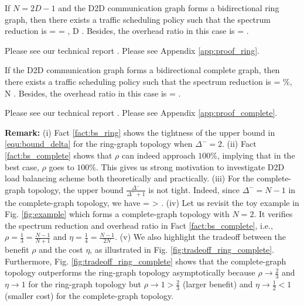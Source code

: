 \begin{fact} \label{fact:bs_ring}
If $N=2D-1$ and the D2D communication graph
forms a bidirectional ring graph, then
there exists a traffic scheduling policy
such that the  spectrum reduction is
\be
\rho = \to {} = ,
 \; {D \to \infty}.
\ee
Besides, the overhead ratio in this case is
\be
\eta = .
\ee
\end{fact}
\begin{IEEEproof}
\ifx \ISTR \undefined
Please see  our technical report \cite{TR}.
\else
Please see Appendix \ref{app:proof_ring}.
\fi
\end{IEEEproof}
\begin{fact} \label{fact:bs_complete}
If the D2D communication graph forms a bidirectional complete graph,
then there exists a traffic scheduling policy such that the spectrum reduction is
\be
\rho =  \%,  \; N \to \infty.
\ee
Besides, the overhead ratio in this case is
\be
\eta = .
\ee
\end{fact}
\begin{IEEEproof}
\ifx \ISTR \undefined
Please see  our technical report \cite{TR}.
\else
Please see Appendix \ref{app:proof_complete}.
\fi
\end{IEEEproof}



\textbf{Remark:}
(i) Fact \ref{fact:bs_ring} shows the tightness of the upper bound in \eqref{equ:bound_delta}
for the ring-graph topology when $\Delta^-=2$.
(ii) { Fact \ref{fact:bs_complete} shows that $\rho$ can indeed approach $100\%$,
implying that in the best case, $\rho$ goes to $100\%$.
This  gives us strong motivation to investigate D2D load balancing scheme both theoretically and practically.}
(iii) For the complete-graph topology, the upper bound $\frac{\Delta^-}{\Delta^-+1}$ is not tight.
Indeed, since $\Delta^- =N-1$ in the complete-graph topology,
we have
\bee
{} =  > .
\eee
(iv) Let us revisit the toy example in Fig. \ref{fig:example}
which forms a complete-graph topology with $N=2$. It verifies the spectrum reduction
and overhead ratio in Fact \ref{fact:bs_complete},
i.e., $\rho = \frac{1}{3} = \frac{N-1}{N+1}$ and $\eta = \frac{1}{4} = \frac{N-1}{2N}$.
(v) We also highlight the tradeoff between the benefit $\rho$ and the cost $\eta$,
as illustrated in Fig. \ref{fig:tradeoff_ring_complete}.
Furthermore, Fig. \ref{fig:tradeoff_ring_complete} shows that
the complete-graph topology outperforms the ring-graph topology asymptotically
because $\rho \to \frac{2}{3}$ and $\eta \to 1 $ for the ring-graph topology but
$\rho \to 1 > \frac{2}{3}$ (larger benefit) and $\eta \to \frac{1}{2} < 1$ (smaller cost) for the complete-graph topology.


